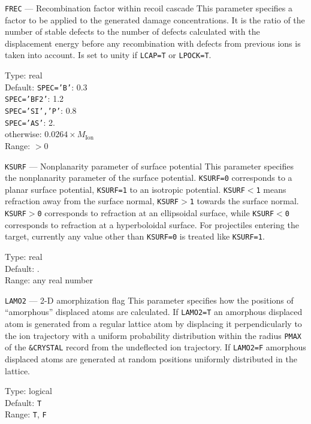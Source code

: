 \begin{keydescription}{\texttt{FREC} --- Recombination factor within
    recoil cascade}
%
  This parameter specifies a factor to be applied to the generated damage 
  concentrations.  It is the ratio of the number of stable defects to
  the number of defects calculated with the displacement energy before
  any recombination with defects from previous ions is taken into
  account.  Is set to unity if \texttt{LCAP=T} or \texttt{LPOCK=T}.
  \begin{keytab}
    Type:    \> real \\
    Default: \> \texttt{SPEC='B'}: 0.3 \\
             \> \texttt{SPEC='BF2'}: 1.2 \\
             \> \texttt{SPEC='SI','P'}: 0.8 \\
             \> \texttt{SPEC='AS'}: 2. \\
             \> otherwise: $0.0264 \times M_\mathrm{Ion}$ \\
    Range:   \> $> 0$
  \end{keytab}
\end{keydescription}

\begin{keydescription}{\texttt{KSURF} --- Nonplanarity parameter of surface
potential}
%
  This parameter specifies the nonplanarity parameter of the surface
  potential. \texttt{KSURF=0} corresponds to a planar surface potential,
  \texttt{KSURF=1} to an isotropic potential. \texttt{KSURF$<$1} means
  refraction away from the surface normal, \texttt{KSURF$>$1} towards the
  surface normal. \texttt{KSURF$>$0} corresponds to refraction at an ellipsoidal
  surface, while \texttt{KSURF$<$0} corresponds to refraction at a hyperboloidal
  surface. For projectiles entering the target, currently any value other than
  \texttt{KSURF=0} is treated like \texttt{KSURF=1}.
  \begin{keytab}
    Type:    \> real \\
    Default: . \\
    Range:   \> any real number
  \end{keytab}
\end{keydescription}

\begin{keydescription}{\texttt{LAMO2} --- 2-D amorphization flag}
%
  This parameter specifies how the positions of ``amorphous'' displaced atoms
  are calculated. If \texttt{LAMO2=T} an amorphous displaced atom is generated
  from a regular lattice atom by displacing it perpendicularly to the ion
  trajectory with a uniform probability distribution within the radius
  \texttt{PMAX} of the \texttt{\&CRYSTAL} record from the undeflected ion 
  trajectory. If \texttt{LAMO2=F} amorphous displaced atoms are generated at 
  random positions uniformly distributed in the lattice.

  \begin{keytab}
    Type:    \> logical \\
    Default: \> \texttt{T} \\
    Range:   \> \texttt{T}, \texttt{F}
  \end{keytab}
\end{keydescription}

